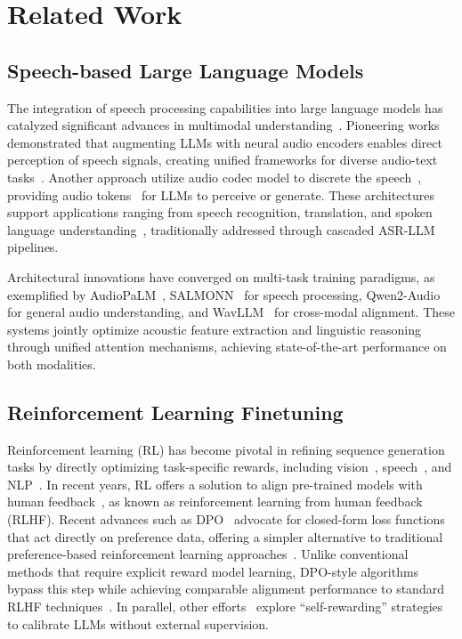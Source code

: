 \documentclass[letterpaper]{article} %
\begin{document}
\section{Related Work}
\subsection{Speech-based Large Language Models}
The integration of speech processing capabilities into large language models has catalyzed significant advances in multimodal understanding~\cite{shu2023llasm,chen2023hyporadise}. Pioneering works~\cite{chu2023qwen,wu2023decoder} demonstrated that augmenting LLMs with neural audio encoders enables direct perception of speech signals, creating unified frameworks for diverse audio-text tasks~\cite{das2024speechverse}. Another approach utilize audio codec model to discrete the speech~\cite{yang2023uniaudio,zhang2023speechgpt}, providing audio tokens~\cite{ji2024wavtokenizer} for LLMs to perceive or generate. These architectures support applications ranging from speech recognition, translation, and spoken language understanding~\cite{fathullah2023audiochatllama,ye2025llasa,hu2025chain}, traditionally addressed through cascaded ASR-LLM pipelines. \par
Architectural innovations have converged on multi-task training paradigms, as exemplified by AudioPaLM~\cite{rubenstein2023audiopalm}, SALMONN~\cite{tang2023salmonn} for speech processing, Qwen2-Audio~\cite{chu2024qwen2} for general audio understanding, and WavLLM~\cite{hu2024wavllm} for cross-modal alignment. These systems jointly optimize acoustic feature extraction and linguistic reasoning through unified attention mechanisms, achieving state-of-the-art performance on both modalities.

\subsection{Reinforcement Learning Finetuning}
Reinforcement learning (RL) has become pivotal in refining sequence generation tasks by directly optimizing task-specific rewards, including vision~\cite{rennie2017self}, speech~\cite{prabhavalkar2018minimum}, and NLP~\cite{wu2018study}. In recent years, RL offers a solution to align pre-trained models with human feedback~\cite{bai2022training,dai2023safe,dong2024rlhf,feng2025duo}, as known as reinforcement learning from human feedback (RLHF). Recent advances such as DPO~\citep{rafailov2024direct} advocate for closed-form loss functions that act directly on preference data, offering a simpler alternative to traditional preference-based reinforcement learning approaches~\citep{jain2013learning,busa2014preference,liu2025survey}. Unlike conventional methods that require explicit reward model learning, DPO-style algorithms bypass this step while achieving comparable alignment performance to standard RLHF techniques~\citep{zhou2023beyond,amini2024direct,zeng2024token,liu2024enhancing}. In parallel, other efforts~\citep{chen2024self,yuan2024self,zhang2025process} explore “self-rewarding” strategies to calibrate LLMs without external supervision. 
\end{document}
